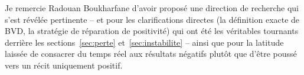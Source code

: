 \documentclass[11pt]{article}
\begin{document}
Je remercie Radouan Boukharfane d'avoir proposé une direction de
recherche qui s'est révélée pertinente -- et pour les clarifications
directes (la définition exacte de BVD, la stratégie de réparation de
positivité) qui ont été les véritables tournants derrière les
sections~\ref{sec:perte} et~\ref{sec:instabilite} -- ainsi que pour la
latitude laissée de consacrer du temps réel aux résultats négatifs plutôt
que d'être poussé vers un récit uniquement positif.
\end{document}
